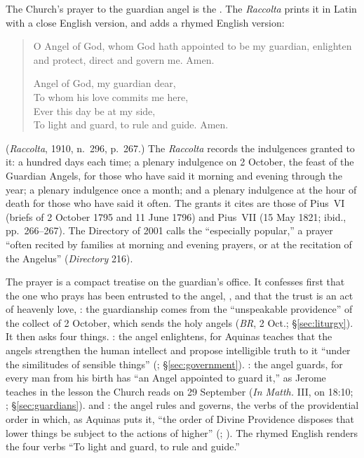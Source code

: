 The Church's prayer to the guardian angel is the .
The \emph{Raccolta} prints it in Latin with a close English version, and
adds a rhymed English version:
\begin{quote}

O Angel of God, whom God hath appointed to be my guardian, enlighten and
protect, direct and govern me. Amen.

Angel of God, my guardian dear,\\
To whom his love commits me here,\\
Ever this day be at my side,\\
To light and guard, to rule and guide. Amen.
\end{quote}
(\emph{Raccolta}, 1910, n.~296, p.~267.) The \emph{Raccolta} records the
indulgences granted to it: a hundred days each time; a plenary indulgence
on 2 October, the feast of the Guardian Angels, for those who have said
it morning and evening through the year; a plenary indulgence once a
month; and a plenary indulgence at the hour of death for those who have
said it often. The grants it cites are those of Pius~VI (briefs of
2 October 1795 and 11 June 1796) and Pius~VII (15 May 1821; ibid.,
pp.~266--267). The Directory of 2001 calls the 
``especially popular,'' a prayer ``often recited by families at morning
and evening prayers, or at the recitation of the Angelus'' (\emph{Directory}
216).

The prayer is a compact treatise on the guardian's office. It confesses
first that the one who prays has been entrusted to the angel, , and that the trust is an act of heavenly love, : the guardianship comes from the ``unspeakable providence'' of
the collect of 2 October, which sends the holy angels  (\emph{BR}, 2 Oct.; \S\ref{sec:liturgy}). It then asks
four things. : the angel enlightens, for Aquinas teaches
that the angels strengthen the human intellect and propose intelligible
truth to it ``under the similitudes of sensible things'' (; \S\ref{sec:government}). : the angel guards, for
every man from his birth has ``an Angel appointed to guard it,'' as Jerome
teaches in the lesson the Church reads on 29 September (\emph{In Matth.}
III, on 18:10; ; \S\ref{sec:guardians}).
 and : the angel rules and governs, the verbs of
the providential order in which, as Aquinas puts it, ``the order of
Divine Providence disposes that lower things be subject to the actions
of higher'' (; ). The rhymed English renders the four
verbs ``To light and guard, to rule and guide.''

